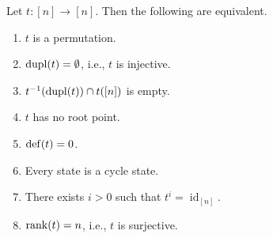 \begin{proposition}
	\label{prelim:prop:permutation} \label{prelim:prop:non-perm-dupl-cycle}
	Let $t \colon [n] \to [n]$. Then the following are equivalent.
	\begin{enumerate}
		\item \label{prelim:prop:item:not_perm} $t$ is a permutation.
		
		\item \label{prelim:prop:item:non_injective} $\operatorname{dupl}(t) = \emptyset$, i.e., $t$ is injective.		
		
		\item \label{prelim:prop:item:invdupl} $t^{-1}(\operatorname{dupl}(t)) \cap t([n])$ is empty.
				
		\item \label{prelim:prop:item:root} $t$ has no root point.
				
		\item \label{prelim:prop:item:defect} $\operatorname{def}(t) = 0$.
		
		\item \label{prelim:prop:item:cycles} Every state is a cycle state.
		
		\item \label{prelim:prop:item:identity} There exists $i > 0$ such that $t^i = \operatorname{id}_{[n]}$.			
		
		\item \label{prelim:prop:item:not_surjective} $\operatorname{rank}(t) = n$, i.e., $t$ is surjective.		
	\end{enumerate}	
\end{proposition}
